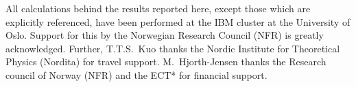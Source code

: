 All calculations behind the results
reported here, except those which are
explicitly referenced,
have been performed at the IBM cluster at the
University of Oslo. Support for this by the Norwegian Research
Council (NFR) is greatly acknowledged. Further, T.T.S.\ Kuo
thanks the Nordic Institute for Theoretical Physics (Nordita)
for travel support. M.\ Hjorth-Jensen thanks the Research 
council of Norway (NFR) and the ECT* for financial support.












